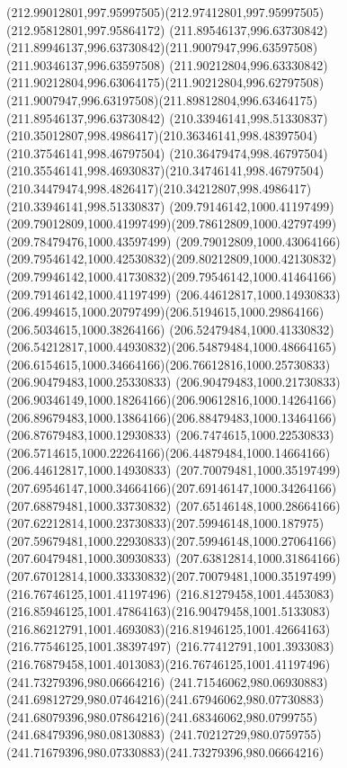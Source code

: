 {{	\curveto(212.99012801,997.95997505)(212.97412801,997.95997505)(212.95812801,997.95864172)
	\moveto(211.89546137,996.63730842)
	\curveto(211.89946137,996.63730842)(211.9007947,996.63597508)(211.90346137,996.63597508)
	\curveto(211.90212804,996.63330842)(211.90212804,996.63064175)(211.90212804,996.62797508)
	\curveto(211.9007947,996.63197508)(211.89812804,996.63464175)(211.89546137,996.63730842)
	\moveto(210.33946141,998.51330837)
	\curveto(210.35012807,998.4986417)(210.36346141,998.48397504)(210.37546141,998.46797504)
	\curveto(210.36479474,998.46797504)(210.35546141,998.46930837)(210.34746141,998.46797504)
	\curveto(210.34479474,998.4826417)(210.34212807,998.4986417)(210.33946141,998.51330837)
	\moveto(209.79146142,1000.41197499)
	\curveto(209.79012809,1000.41997499)(209.78612809,1000.42797499)(209.78479476,1000.43597499)
	\curveto(209.79012809,1000.43064166)(209.79546142,1000.42530832)(209.80212809,1000.42130832)
	\curveto(209.79946142,1000.41730832)(209.79546142,1000.41464166)(209.79146142,1000.41197499)
	\moveto(206.44612817,1000.14930833)
	\curveto(206.4994615,1000.20797499)(206.5194615,1000.29864166)(206.5034615,1000.38264166)
	\curveto(206.52479484,1000.41330832)(206.54212817,1000.44930832)(206.54879484,1000.48664165)
	\curveto(206.6154615,1000.34664166)(206.76612816,1000.25730833)(206.90479483,1000.25330833)
	\curveto(206.90479483,1000.21730833)(206.90346149,1000.18264166)(206.90612816,1000.14264166)
	\curveto(206.89679483,1000.13864166)(206.88479483,1000.13464166)(206.87679483,1000.12930833)
	\curveto(206.7474615,1000.22530833)(206.5714615,1000.22264166)(206.44879484,1000.14664166)
	\lineto(206.44612817,1000.14930833)
	\moveto(207.70079481,1000.35197499)
	\curveto(207.69546147,1000.34664166)(207.69146147,1000.34264166)(207.68879481,1000.33730832)
	\curveto(207.65146148,1000.28664166)(207.62212814,1000.23730833)(207.59946148,1000.187975)
	\curveto(207.59679481,1000.22930833)(207.59946148,1000.27064166)(207.60479481,1000.30930833)
	\curveto(207.63812814,1000.31864166)(207.67012814,1000.33330832)(207.70079481,1000.35197499)
	\moveto(216.76746125,1001.41197496)
	\curveto(216.81279458,1001.4453083)(216.85946125,1001.47864163)(216.90479458,1001.5133083)
	\curveto(216.86212791,1001.4693083)(216.81946125,1001.42664163)(216.77546125,1001.38397497)
	\curveto(216.77412791,1001.3933083)(216.76879458,1001.4013083)(216.76746125,1001.41197496)
	\moveto(241.73279396,980.06664216)
	\curveto(241.71546062,980.06930883)(241.69812729,980.07464216)(241.67946062,980.07730883)
	\curveto(241.68079396,980.07864216)(241.68346062,980.0799755)(241.68479396,980.08130883)
	\curveto(241.70212729,980.0759755)(241.71679396,980.07330883)(241.73279396,980.06664216)
}}
